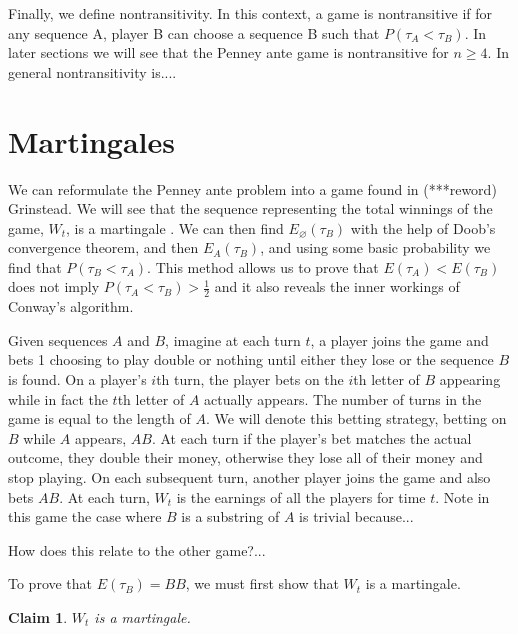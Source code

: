 \documentclass{article}
\newtheorem{claim}[theorem]{Claim}
\numberwithin{mytheorem}{subsection} %
\begin{document}
		Finally, we define nontransitivity. In this context, a game is nontransitive if for any sequence A, player B can choose a sequence B such that $P(\tau_A < \tau_B)$. In later sections we will see that the Penney ante game is nontransitive for $n \geq 4$. In general nontransitivity is....

	\section{Martingales}
	    We can reformulate the Penney ante problem into a game found in (***reword) Grinstead. We will see that the sequence representing the total winnings of the game, $W_t$, is a martingale \cite{grinstead}. We can then find $E_{\varnothing}(\tau_{B})$ with the help of Doob's convergence theorem, and then $E_A(\tau_{B})$, and using some basic probability we find that $P(\tau_{B} < \tau_{A})$. This method allows us to prove that $E(\tau_A) < E(\tau_B)$ does not imply $P(\tau_A < \tau_B) > \frac{1}{2}$ and it also reveals the inner workings of Conway's algorithm. 

	    Given sequences $A$ and $B$, imagine at each turn $t$, a player joins the game and bets 1 choosing to play double or nothing until either they lose or the sequence $B$ is found. On a player's $i$th turn, the player bets on the $i$th letter of $B$ appearing while in fact the $t$th letter of $A$ actually appears. The number of turns in the game is equal to the length of $A$. We will denote this betting strategy, betting on $B$ while $A$ appears, $AB$. At each turn if the player's bet matches the actual outcome, they double their money, otherwise they lose all of their money and stop playing. On each subsequent turn, another player joins the game and also bets $AB$. At each turn, $W_t$ is the earnings of all the players for time $t$. Note in this game the case where $B$ is a substring of $A$ is trivial because... \cite{grinstead} 

	    How does this relate to the other game?...

	    To prove that $E(\tau_B) = BB$, we must first show that $W_t$ is a martingale.

		\begin{claim}
			$W_t$ is a martingale.
		\end{claim}
\end{document}
